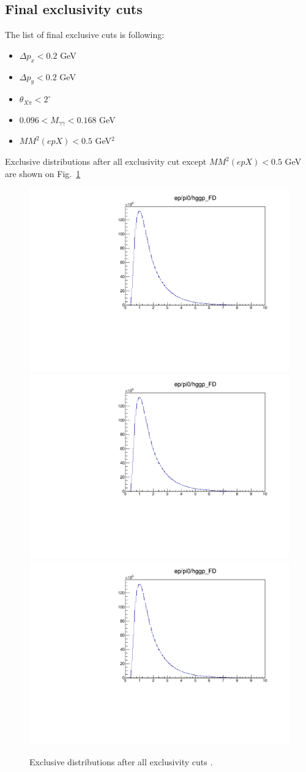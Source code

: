 \clearpage

\subsection{Final exclusivity cuts}

The list of final exclusive cuts is following:
\begin{itemize}
	\item $\Delta p_x<0.2$ GeV
	\item $\Delta p_y<0.2$ GeV
	\item $\theta_{X\pi}<2^\circ$
	\item $0.096<M_{\gamma\gamma}<0.168$ GeV
	\item $MM^2(epX)<0.5$ GeV$^2$
\end{itemize}

Exclusive distributions after all exclusivity cut except $MM^2(epX)<0.5$ GeV are shown on Fig.~\ref{fig:finalexclusive}

\begin{figure}[hbt]
	\centering
	
	\includegraphics[page=82,width=0.32\linewidth]{Chapters/Ch4-BaseAnalysis/1_Exclusivity_Cuts/figures/eppi0.exclusive.pdf}
	\includegraphics[page=83,width=0.32\linewidth]{Chapters/Ch4-BaseAnalysis/1_Exclusivity_Cuts/figures/eppi0.exclusive.pdf}
	\includegraphics[page=84,width=0.32\linewidth]{Chapters/Ch4-BaseAnalysis/1_Exclusivity_Cuts/figures/eppi0.exclusive.pdf}
	\caption{Exclusive distributions after all exclusivity cuts .}
	\label{fig:finalexclusive}
\end{figure}







